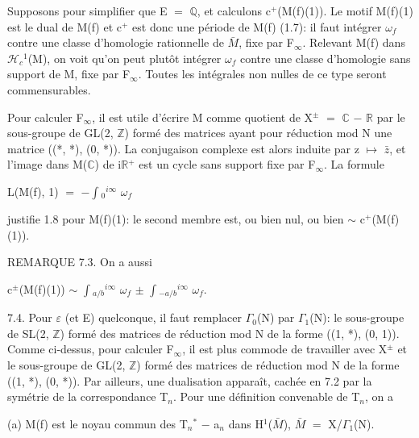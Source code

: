 \documentclass[10pt,twoside]{article}
\begin{document}
Supposons pour simplifier que E \ensuremath{=} \ensuremath{ℚ}, et calculons c\ensuremath{^{+}}(M(f)(1)). Le motif M(f)(1) est le dual de M(f) et c\ensuremath{^{+}} est donc une période de M(f) (1.7): il faut intégrer \ensuremath{ω}\ensuremath{_{f}} contre une classe d’homologie rationnelle de \ensuremath{\bar{M}}, fixe par F\ensuremath{_{∞}}. Relevant M(f) dans \ensuremath{ℋ}\ensuremath{_{c}}\ensuremath{^{1}}(M), on voit qu’on peut plutôt intégrer \ensuremath{ω}\ensuremath{_{f}} contre une classe d’homologie sans support de M, fixe par F\ensuremath{_{∞}}. Toutes les intégrales non nulles de ce type seront commensurables.\par
Pour calculer F\ensuremath{_{∞}}, il est utile d’écrire M comme quotient de X\ensuremath{^{±}} \ensuremath{=} \ensuremath{ℂ} \ensuremath{−} \ensuremath{ℝ} par le sous-groupe de GL(2, \ensuremath{ℤ}) formé des matrices ayant pour réduction mod N une matrice ((*, *), (0, *)). La conjugaison complexe est alors induite par z \ensuremath{↦} \ensuremath{\bar{z}}, et l’image dans M(\ensuremath{ℂ}) de i\ensuremath{ℝ}\ensuremath{^{+}} est un cycle sans support fixe par F\ensuremath{_{∞}}. La formule\par
L(M(f), 1) \ensuremath{=} \ensuremath{−}\ensuremath{∫}\ensuremath{_{0}}\ensuremath{^{i∞}} \ensuremath{ω}\ensuremath{_{f}}\par
justifie 1.8 pour M(f)(1): le second membre est, ou bien nul, ou bien \ensuremath{∼} c\ensuremath{^{+}}(M(f)(1)).\par
REMARQUE 7.3. On a aussi\par
c\ensuremath{^{±}}(M(f)(1)) \ensuremath{∼} \ensuremath{∫}\ensuremath{_{a/b}}\ensuremath{^{i∞}} \ensuremath{ω}\ensuremath{_{f}} \ensuremath{±} \ensuremath{∫}\ensuremath{_{−a/b}}\ensuremath{^{i∞}} \ensuremath{ω}\ensuremath{_{f}}.\par
7.4. Pour \ensuremath{ε} (et E) quelconque, il faut remplacer \ensuremath{Γ}\ensuremath{_{0}}(N) par \ensuremath{Γ}\ensuremath{_{1}}(N): le sous-groupe de SL(2, \ensuremath{ℤ}) formé des matrices de réduction mod N de la forme ((1, *), (0, 1)). Comme ci-dessus, pour calculer F\ensuremath{_{∞}}, il est plus commode de travailler avec X\ensuremath{^{±}} et le sous-groupe de GL(2, \ensuremath{ℤ}) formé des matrices de réduction mod N de la forme ((1, *), (0, *)). Par ailleurs, une dualisation apparaît, cachée en 7.2 par la symétrie de la correspondance T\ensuremath{_{n}}. Pour une définition convenable de T\ensuremath{_{n}}, on a\par
(a) M(f) est le noyau commun des T\ensuremath{_{n}}\ensuremath{^{*}} \ensuremath{−} a\ensuremath{_{n}} dans H\ensuremath{^{1}}(\ensuremath{\bar{M}}), \ensuremath{\bar{M}} \ensuremath{=} X/\ensuremath{Γ}\ensuremath{_{1}}(N).\par
\end{document}
